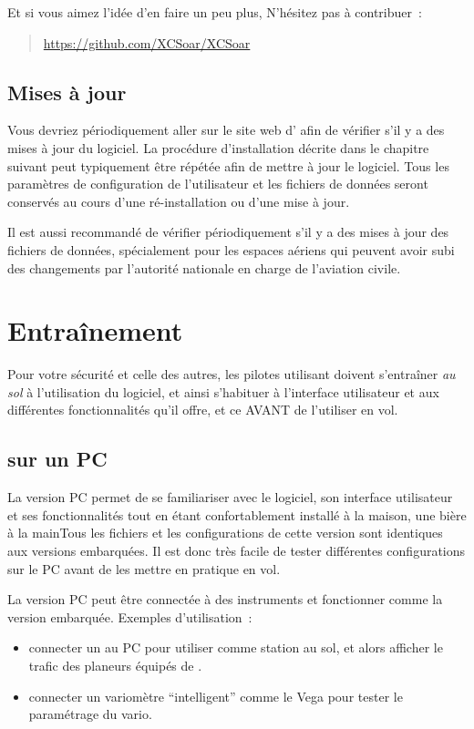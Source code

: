 Et si vous aimez l'idée d'en faire un peu plus, N'hésitez pas à contribuer~:
\begin{quote}
\url{https://github.com/XCSoar/XCSoar}
\end{quote}

\subsection*{Mises à jour}
Vous devriez périodiquement aller sur le site web d'\xc{} afin de vérifier s'il
y a des mises à jour du logiciel. La procédure d'installation décrite dans le chapitre suivant peut typiquement
être répétée afin de mettre à jour le logiciel. Tous les paramètres de configuration
de l'utilisateur et les fichiers de données seront conservés au cours
d'une ré-installation ou d'une mise à jour.

Il est aussi recommandé de vérifier périodiquement s'il y a des mises à jour des fichiers
de données, spécialement pour les espaces aériens qui peuvent avoir subi des 
changements par l'autorité nationale en charge de l'aviation civile.

\section{Entraînement}
Pour votre sécurité et celle des autres, les pilotes utilisant \xc{} doivent s'entraîner \emph{au sol}
à l'utilisation du logiciel, et ainsi s'habituer à l'interface utilisateur et aux différentes fonctionnalités qu'il offre, et ce AVANT de l'utiliser en vol.

\subsection*{\xc{} sur un PC}
La version PC permet de se familiariser avec le logiciel, son interface utilisateur et ses fonctionnalités tout en étant confortablement installé à la maison, une bière à la main\textellipsis Tous les fichiers et les configurations de cette version sont identiques aux versions embarquées. Il est donc très facile de tester différentes configurations sur le PC avant de les mettre en pratique en vol.

La version PC peut être connectée à des instruments et fonctionner comme la version embarquée. Exemples d'utilisation~:
\begin{itemize}
\item connecter un \fl{} au PC pour utiliser \xc{} comme station au sol, et alors afficher le trafic des planeurs équipés de \fl.
\item connecter un variomètre ``intelligent'' comme le Vega pour tester le paramétrage du vario.
\end{itemize}

